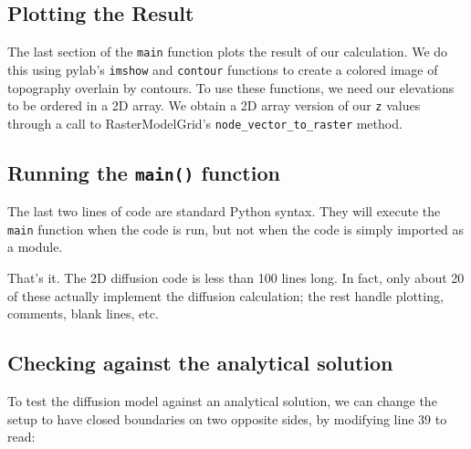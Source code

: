 \documentclass[12pt]{article}
\newcommand{\code}[1]{{\tt #1}}
\begin{document}
%
%
%


\subsection{Plotting the Result}



The last section of the \code{main} function plots the result of our calculation. We do this using pylab's \code{imshow} and \code{contour} functions to create a colored image of topography overlain by contours. To use these functions, we need our elevations to be ordered in a 2D array. We obtain a 2D array version of our \code{z} values through a call to RasterModelGrid's \code{node\_vector\_to\_raster} method.

\subsection{Running the \code{main()} function}



The last two lines of code are standard Python syntax. They will execute the \code{main} function when the code is run, but not when the code is simply imported as a module.

That's it. The 2D diffusion code is less than 100 lines long. In fact, only about 20 of these actually implement the diffusion calculation; the rest handle plotting, comments, blank lines, etc.

\subsection{Checking against the analytical solution}

To test the diffusion model against an analytical solution, we can change the setup to have closed boundaries on two opposite sides, by modifying line 39 to read:
\end{document}
